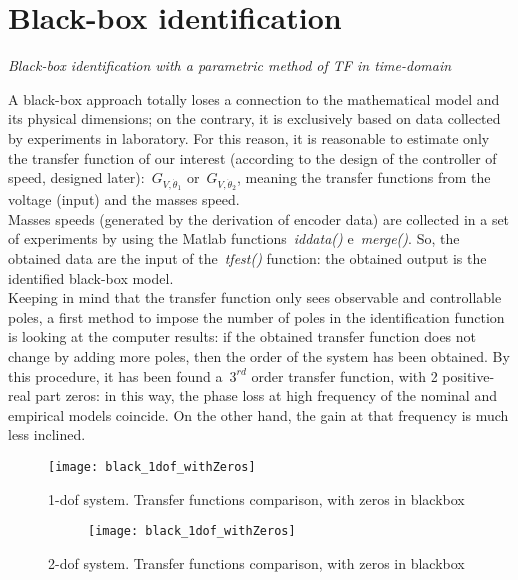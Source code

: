\section{Black-box identification}

\textit{Black-box identification with a parametric method of TF in time-domain} \\

\par A black-box approach totally loses a connection to the mathematical model and its physical dimensions; on the contrary, it is exclusively based on data collected by experiments in laboratory.
For this reason, it is reasonable to estimate only the transfer function of our interest (according to the design of the controller of speed, designed later):~$G_{V,\dot{\theta}_1}$ or~$G_{V,\dot{\theta}_2}$, meaning the transfer functions from the voltage (input) and the masses speed. \\

Masses speeds (generated by the derivation of encoder data) are collected in a set of experiments by using the Matlab functions~\textit{iddata()} e~\textit{merge()}. So, the obtained data are the input of the~\textit{tfest()} function: the obtained output is the identified black-box model. \\

Keeping in mind that the transfer function only sees observable and controllable poles, a first method to impose the number of poles in the identification function is looking at the computer results: if the obtained transfer function does not change by adding more poles, then the order of the system has been obtained.
By this procedure, it has been found a~$3^{rd}$ order transfer function, with 2 positive-real part zeros: in this way, the phase loss at high frequency of the nominal and empirical models coincide. On the other hand, the gain at that frequency is much less inclined.

\begin{figure*}[h]
	\centering
	\texttt{[image: black\_1dof\_withZeros]}
	\caption{1-dof system. Transfer functions comparison, with zeros in blackbox}
\end{figure*}
\begin{figure*}[h]
	\centering
	\begin{subfigure}{\columnwidth}
	\end{subfigure}
	\begin{subfigure}{\columnwidth}
		\texttt{[image: black\_1dof\_withZeros]}
	\end{subfigure}
	\caption{2-dof system. Transfer functions comparison, with zeros in blackbox}
\end{figure*}

